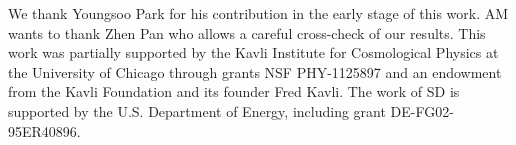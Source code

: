 \documentclass[aps,prd,reprint,superscriptaddress]{revtex4-1}
\begin{document}



\begin{acknowledgments}
We thank Youngsoo Park for his contribution in the early stage of this work.
AM wants to thank Zhen Pan who allows a careful cross-check of our results.
This work was partially supported by the Kavli Institute for Cosmological Physics at the University of Chicago through grants NSF PHY-1125897 and an endowment from the Kavli Foundation and its founder Fred Kavli.
The work of SD is supported by the U.S. Department of Energy, including grant DE-FG02-95ER40896.
\end{acknowledgments}


\end{document}
